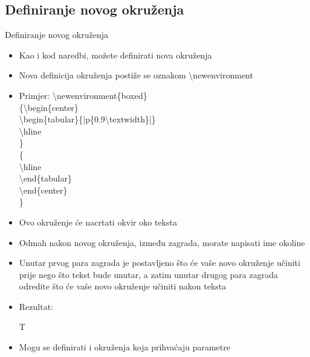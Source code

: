 \documentclass{beamer}
\begin{document}
\subsection{Definiranje novog okruženja}

\begin{frame}{Definiranje novog okruženja}
\begin{itemize}

\item Kao i kod naredbi, možete definirati nova okruženja
\item Nova definicija okruženja postiže se oznakom \textbackslash newenvironment
\item Primjer:
\textbackslash newenvironment\{boxed\}\\
\{\textbackslash begin\{center\}\\
    \textbackslash begin\{tabular\}\{|p\{0.9\textbackslash textwidth\}|\}\\
    \textbackslash hline\\
    \}\\
    \{ \\
    \textbackslash hline\\
    \textbackslash end\{tabular\} \\
    \textbackslash end\{center\}\\
    \}\\
    \item Ovo okruženje će nacrtati okvir oko teksta
\end{itemize}
\end{frame}

\begin{frame}
\begin{itemize}
	\item Odmah nakon novog okruženja, između zagrada, morate napisati ime okoline
	\item Unutar prvog para zagrada je postavljeno što će vaše novo okruženje učiniti prije nego što tekst bude unutar, a zatim unutar drugog para zagrada odredite što će vaše novo okruženje učiniti nakon teksta
\item Rezultat:
\begin{boxed}
T
\end{boxed}

	\item Mogu se definirati i okruženja koja prihvaćaju parametre

\end{itemize}
\end{frame}
\end{document}
